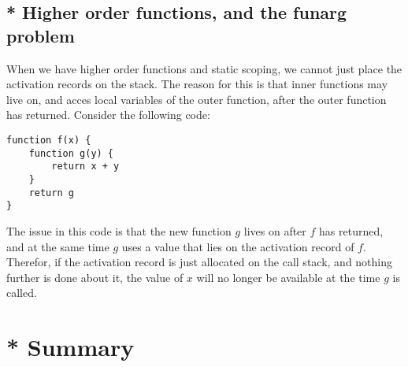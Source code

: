 \subsection{* Higher order functions, and the funarg problem}
When we have higher order functions and static scoping, we cannot just place the activation records on the stack. The reason for this is that inner functions may live on, and acces local variables of the outer function, after the outer function has returned. Consider the following code:
\begin{verbatim}
function f(x) {
    function g(y) {
        return x + y
    }
    return g
}
\end{verbatim}

The issue in this code is that the new function $g$ lives on after $f$ has returned, and at the same time $g$ uses a value that lies on the activation record of $f$. Therefor, if the activation record is just allocated on the call stack, and nothing further is done about it, the value of $x$ will no longer be available at the time $g$ is called.


\label{funarg}





\section{* Summary}
